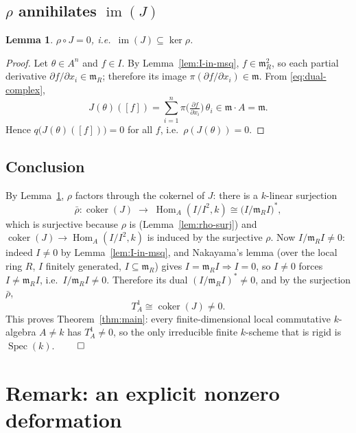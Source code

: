 \documentclass{amsart}
\newtheorem{lemma}{Lemma}
\begin{document}
\subsection{$\rho$ annihilates $\operatorname{im}(J)$}
\begin{lemma}\label{lem:J-killed}
$\rho\circ J=0$, i.e.\ $\operatorname{im}(J)\subseteq\ker\rho$.
\end{lemma}

\begin{proof}
Let $\theta\in A^n$ and $f\in I$. By Lemma~\ref{lem:I-in-msq},
$f\in\mathfrak m_R^2$, so each partial derivative
$\partial f/\partial x_i\in\mathfrak m_R$; therefore its image
$\pi(\partial f/\partial x_i)\in\mathfrak m$. From \eqref{eq:dual-complex},
\[
J(\theta)([f])=\sum_{i=1}^n
\pi\!\Big(\tfrac{\partial f}{\partial x_i}\Big)\,\theta_i\in\mathfrak m\cdot A=\mathfrak m .
\]
Hence $q\bigl(J(\theta)([f])\bigr)=0$ for all $f$, i.e.\ $\rho(J(\theta))=0$.
\end{proof}

\subsection{Conclusion}
By Lemma~\ref{lem:J-killed}, $\rho$ factors through the cokernel of $J$:
there is a $k$-linear surjection
\[
\bar\rho\colon \operatorname{coker}(J)\;\xrightarrow{\;\;}\;
\operatorname{Hom}_A(I/I^2,k)\cong\bigl(I/\mathfrak m_R I\bigr)^{*},
\]
which is surjective because $\rho$ is (Lemma~\ref{lem:rho-surj}) and
$\operatorname{coker}(J)\to\operatorname{Hom}_A(I/I^2,k)$ is induced by the surjective
$\rho$. Now $I/\mathfrak m_R I\neq 0$: indeed $I\neq 0$ by Lemma~\ref{lem:I-in-msq},
and Nakayama's lemma (over the local ring $R$, $I$ finitely generated,
$I\subseteq\mathfrak m_R$) gives $I=\mathfrak m_R I\Rightarrow I=0$, so $I\neq 0$
forces $I\neq\mathfrak m_R I$, i.e.\ $I/\mathfrak m_R I\neq 0$. Therefore its dual
$(I/\mathfrak m_R I)^{*}\neq 0$, and by the surjection $\bar\rho$,
\[
T^1_A\cong\operatorname{coker}(J)\neq 0 .
\]
This proves Theorem~\ref{thm:main}: every finite-dimensional local commutative
$k$-algebra $A\neq k$ has $T^1_A\neq 0$, so the only irreducible finite
$k$-scheme that is rigid is $\operatorname{Spec}(k)$.
\hfill$\qed$

\section{Remark: an explicit nonzero deformation}
\end{document}
